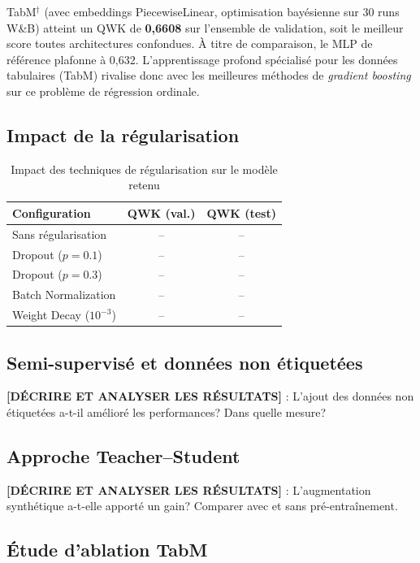 \documentclass[conference]{IEEEtran}
\begin{document}
TabM$^\dagger$ (avec embeddings PiecewiseLinear, optimisation bayésienne sur 30 runs W\&B)
atteint un QWK de \textbf{0,6608} sur l'ensemble de validation, soit le meilleur score
toutes architectures confondues. À titre de comparaison, le MLP de référence plafonne à
0,632. L'apprentissage profond spécialisé pour les données tabulaires (TabM) rivalise donc
avec les meilleures méthodes de \textit{gradient boosting} sur ce problème de régression ordinale.

\subsection{Impact de la régularisation}

\begin{table}[htbp]
\caption{Impact des techniques de régularisation sur le modèle retenu}
\label{tab:regularisation}
\centering
\begin{tabular}{lcc}
\toprule
\textbf{Configuration} & \textbf{QWK (val.)} & \textbf{QWK (test)} \\
\midrule
Sans régularisation & -- & -- \\
Dropout ($p=0.1$)   & -- & -- \\
Dropout ($p=0.3$)   & -- & -- \\
Batch Normalization & -- & -- \\
Weight Decay ($10^{-3}$) & -- & -- \\
\bottomrule
\end{tabular}
\end{table}

\subsection{Semi-supervisé et données non étiquetées}

\textbf{[DÉCRIRE ET ANALYSER LES RÉSULTATS]} : L'ajout des données non étiquetées a-t-il
amélioré les performances? Dans quelle mesure?

\subsection{Approche Teacher--Student}

\textbf{[DÉCRIRE ET ANALYSER LES RÉSULTATS]} : L'augmentation synthétique a-t-elle apporté
un gain? Comparer avec et sans pré-entraînement.

\subsection{Étude d'ablation TabM}
\end{document}
